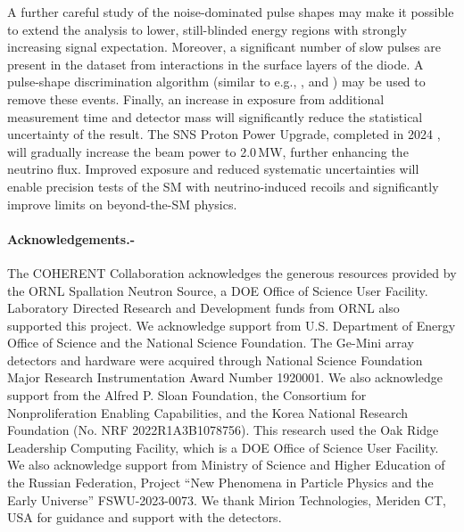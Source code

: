 \documentclass[aps,prltightenlines,superscriptaddress,nofootinbib,amsmath,amssymb,reprint]{revtex4-2}
\begin{document}
A further careful study of the noise-dominated pulse shapes may make it possible to extend the analysis to lower, still-blinded energy regions with strongly increasing signal expectation. 
Moreover, a significant number of slow pulses are present in the dataset from interactions in the surface layers of the diode. 
A pulse-shape discrimination algorithm (similar to e.g., \cite{cooper2011pulse}, \cite{agostini2022pulse} and \cite{bonet2024pulse}) may be used to remove these events.
Finally, an increase in exposure from additional measurement time and detector mass will significantly reduce the statistical uncertainty of the result. 
The SNS Proton Power Upgrade, completed in 2024 \cite{akimov2022simulating}, will gradually increase the beam power to 2.0\,MW, further enhancing the neutrino flux. Improved exposure and reduced systematic uncertainties will enable precision tests of the SM with neutrino-induced recoils and significantly improve limits on beyond-the-SM physics.
\paragraph*{Acknowledgements.-}
The COHERENT Collaboration acknowledges the generous resources provided by the ORNL Spallation Neutron Source, a DOE Office of Science User Facility. Laboratory Directed Research and Development funds from ORNL also supported this project. We acknowledge support from U.S. Department of Energy Office of Science and the National Science Foundation.  
The Ge-Mini array detectors and hardware were acquired through National Science Foundation Major Research Instrumentation Award Number 1920001.
We also acknowledge support from the Alfred P. Sloan Foundation, the Consortium for Nonproliferation Enabling Capabilities, and the Korea National Research Foundation (No. NRF 2022R1A3B1078756). This research used the Oak Ridge Leadership Computing Facility, which is a DOE Office of Science User Facility. We also acknowledge support from Ministry of Science and Higher Education of the Russian Federation, Project “New Phenomena in Particle Physics and the Early Universe” FSWU-2023-0073. We thank Mirion Technologies, Meriden CT, USA for guidance and support with the detectors.

\nocite{*}

\end{document}
